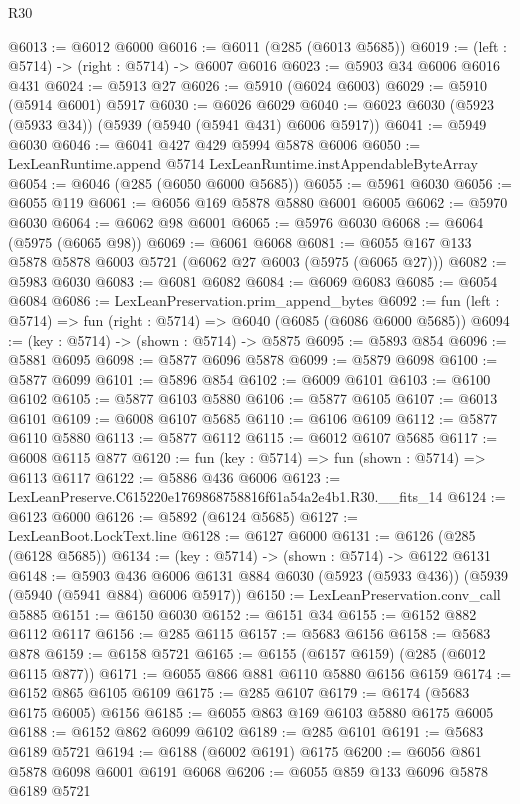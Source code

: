 \begin{lexlean}{R30}
\begin{coremodule}
@6013 := @6012 @6000
@6016 := @6011 (@285 (@6013 @5685))
@6019 := (left : @5714) -> (right : @5714) -> @6007 @6016
@6023 := @5903 @34 @6006 @6016 @431
@6024 := @5913 @27
@6026 := @5910 (@6024 @6003)
@6029 := @5910 (@5914 @6001) @5917
@6030 := @6026 @6029
@6040 := @6023 @6030 (@5923 (@5933 @34)) (@5939 (@5940 (@5941 @431) @6006 @5917))
@6041 := @5949 @6030
@6046 := @6041 @427 @429 @5994 @5878 @6006
@6050 := LexLeanRuntime.append @5714 LexLeanRuntime.instAppendableByteArray
@6054 := @6046 (@285 (@6050 @6000 @5685))
@6055 := @5961 @6030
@6056 := @6055 @119
@6061 := @6056 @169 @5878 @5880 @6001 @6005
@6062 := @5970 @6030
@6064 := @6062 @98 @6001
@6065 := @5976 @6030
@6068 := @6064 (@5975 (@6065 @98))
@6069 := @6061 @6068
@6081 := @6055 @167 @133 @5878 @5878 @6003 @5721 (@6062 @27 @6003 (@5975 (@6065 @27)))
@6082 := @5983 @6030
@6083 := @6081 @6082
@6084 := @6069 @6083
@6085 := @6054 @6084
@6086 := LexLeanPreservation.prim_append_bytes
@6092 := fun (left : @5714) => fun (right : @5714) => @6040 (@6085 (@6086 @6000 @5685))
@6094 := (key : @5714) -> (shown : @5714) -> @5875
@6095 := @5893 @854
@6096 := @5881 @6095
@6098 := @5877 @6096 @5878
@6099 := @5879 @6098
@6100 := @5877 @6099
@6101 := @5896 @854
@6102 := @6009 @6101
@6103 := @6100 @6102
@6105 := @5877 @6103 @5880
@6106 := @5877 @6105
@6107 := @6013 @6101
@6109 := @6008 @6107 @5685
@6110 := @6106 @6109
@6112 := @5877 @6110 @5880
@6113 := @5877 @6112
@6115 := @6012 @6107 @5685
@6117 := @6008 @6115 @877
@6120 := fun (key : @5714) => fun (shown : @5714) => @6113 @6117
@6122 := @5886 @436 @6006
@6123 := LexLeanPreserve.C615220e1769868758816f61a54a2e4b1.R30.__fits_14
@6124 := @6123 @6000
@6126 := @5892 (@6124 @5685)
@6127 := LexLeanBoot.LockText.line
@6128 := @6127 @6000
@6131 := @6126 (@285 (@6128 @5685))
@6134 := (key : @5714) -> (shown : @5714) -> @6122 @6131
@6148 := @5903
    @436
    @6006
    @6131
    @884
    @6030
    (@5923 (@5933 @436))
    (@5939 (@5940 (@5941 @884) @6006 @5917))
@6150 := LexLeanPreservation.conv_call @5885
@6151 := @6150 @6030
@6152 := @6151 @34
@6155 := @6152 @882 @6112 @6117
@6156 := @285 @6115
@6157 := @5683 @6156
@6158 := @5683 @878
@6159 := @6158 @5721
@6165 := @6155 (@6157 @6159) (@285 (@6012 @6115 @877))
@6171 := @6055 @866 @881 @6110 @5880 @6156 @6159
@6174 := @6152 @865 @6105 @6109
@6175 := @285 @6107
@6179 := @6174 (@5683 @6175 @6005) @6156
@6185 := @6055 @863 @169 @6103 @5880 @6175 @6005
@6188 := @6152 @862 @6099 @6102
@6189 := @285 @6101
@6191 := @5683 @6189 @5721
@6194 := @6188 (@6002 @6191) @6175
@6200 := @6056 @861 @5878 @6098 @6001 @6191 @6068
@6206 := @6055 @859 @133 @6096 @5878 @6189 @5721

\end{coremodule}
\end{lexlean}

